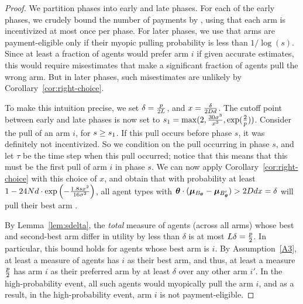 \begin{proof}
We partition phases into early and late phases.
For each of the early phases,
we crudely bound the number of payments by \ARMNUM,
using that each arm is incentivized at most once per phase.
For later phases,
we use that arms are payment-eligible only if their myopic pulling
probability is less than $1/\log(s)$.
Since at least a \MinProb fraction of agents would prefer arm $i$ if
given accurate estimates, this would require misestimates that make a
significant fraction of agents pull the wrong arm.
But in later phases, such misestimates are unlikely by
Corollary~\ref{cor:right-choice}.

To make this intuition precise, we set
$\delta = \frac{p}{2 L}$,
and $x = \frac{\delta}{2 D d}$.
The cutoff point between early and late phases is now set to
$s_1 = \max(2, \frac{30 \sigma^3}{x^3}, \exp(\frac{2}{p}))$.
Consider the  pull of an arm $i$, for $s \geq s_1$.
If this pull occurs before phase $s$, it was definitely not incentivized.
So we condition on the pull occurring in phase $s$,
and let $\tau$ be the time step when this pull occurred; notice that
this means that this must be the first pull of arm $i$ in phase $s$.
We can now apply Corollary~\ref{cor:right-choice}
with this choice of $x$,
and obtain that with probability at least 
$1 - 24 N d \cdot \exp\left(-\frac{1.8 s x^2}{16 \sigma^2} \right)$,
all agent types \AgV with
$\bm{\theta} \cdot (\bm{\mu}_{B_{\bm{\theta}}} - \bm{\mu}_{B'_{\bm{\theta}}})
> 2D d x = \delta$
will pull their best arm \Best{\AgV}.

By Lemma~\ref{lem:sdelta}, the \emph{total} measure of agents (across
all arms) whose best and second-best arm differ in utility by less
than $\delta$ is at most $L \delta = \frac{p}{2}$.
In particular, this bound holds for agents whose best arm is $i$.
By Assumption~\ref{A3}, at least a measure \MinProb of agents has $i$
as their best arm, and thus, at least a measure $\frac{p}{2}$
has arm $i$ as their preferred arm by at least $\delta$ over any other
arm $i'$.
In the high-probability event, all such agents would myopically pull
the arm $i$, and as a result, in the high-probability event,
arm $i$ is not payment-eligible.


\end{proof}
